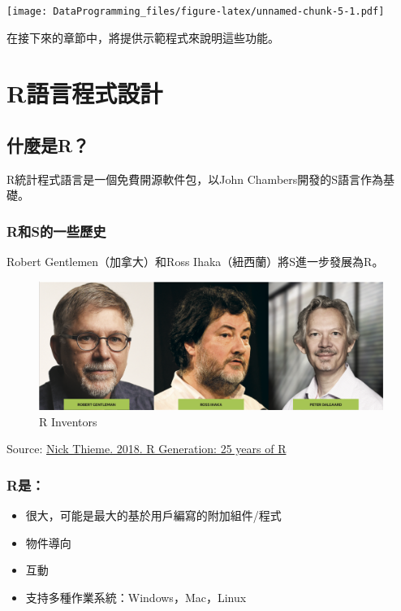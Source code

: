 \documentclass[]{book}
\providecommand{\tightlist}{%
  \setlength{\itemsep}{0pt}\setlength{\parskip}{0pt}}
\begin{document}
\texttt{[image: DataProgramming\_files/figure-latex/unnamed-chunk-5-1.pdf]}

在接下來的章節中，將提供示範程式來說明這些功能。

\hypertarget{r}{%
\chapter{R語言程式設計}\label{r}}

\hypertarget{r-1}{%
\section{什麼是R？}\label{r-1}}

R統計程式語言是一個免費開源軟件包，以John Chambers開發的S語言作為基礎。

\hypertarget{rs}{%
\subsection{R和S的一些歷史}\label{rs}}

Robert Gentlemen（加拿大）和Ross Ihaka（紐西蘭）將S進一步發展為R。

\begin{figure}
\includegraphics[width=1\linewidth]{Rinventors} \caption{R Inventors}\label{fig:Rinventors}
\end{figure}

Source: \href{https://rss.onlinelibrary.wiley.com/doi/10.1111/j.1740-9713.2018.01169.x}{Nick Thieme. 2018. R Generation: 25 years of R}

\hypertarget{r-2}{%
\subsection{R是：}\label{r-2}}

\begin{itemize}
\tightlist
\item
  很大，可能是最大的基於用戶編寫的附加組件/程式
\item
  物件導向
\item
  互動
\item
  支持多種作業系統：Windows，Mac，Linux
\end{itemize}
\end{document}
